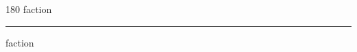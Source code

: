
\begin{frame}
\begin{center}
\begin{turn}{180}
{\fontsize{2.5cm}{1em}\selectfont faction}
\end{turn}
\vspace{1em}\par  
\hrule
\vspace{1em}\par  
{\fontsize{2.5cm}{1em}\selectfont faction}
\end{center}
\end{frame}
